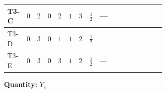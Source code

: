 \documentclass[8pt]{article}
\begin{document}
\begin{landscape}
\begin{longtable}{@{}llcccccc >{\raggedright\arraybackslash}p{0.21\linewidth} >{\raggedright\arraybackslash}p{0.21\linewidth} >{\raggedright\arraybackslash}p{0.21\linewidth}@{}}
\midrule
T3-C & $0$ & $2$ & $0$ & $2$ & $1$ & $3$ & $\frac{1}{2}$ & --- & \scriptsize\adjustbox{max width=\linewidth}{$\begin{gathered} -\frac{9}{4} {g_2}^2 \left({Y_e}\right)_{ij}\end{gathered}$} & \scriptsize\adjustbox{max width=\linewidth}{$\begin{gathered} -\frac{15}{4} {g_1}^2 \left({Y_e}\right)_{ij}\end{gathered}$} \\
\midrule
T3-D & $0$ & $3$ & $0$ & $1$ & $1$ & $2$ & $\frac{1}{2}$ & \scriptsize\adjustbox{max width=\linewidth}{$\begin{gathered} +\frac{1}{4} (3 \left({y_1}\,\left({y_1}\right)^{\dagger}\,{Y_e}\right)_{ij}+2 \left({y_2}\,\left({y_2}\right)^{\dagger}\,{Y_e}\right)_{ij}+6 \left({Y_e}\,\left({Y_e}\right)^{\dagger}\,{Y_e}\right)_{ij})\end{gathered}$} & \scriptsize\adjustbox{max width=\linewidth}{$\begin{gathered} -\frac{9}{4} {g_2}^2 \left({Y_e}\right)_{ij}\end{gathered}$} & \scriptsize\adjustbox{max width=\linewidth}{$\begin{gathered} -\frac{15}{4} {g_1}^2 \left({Y_e}\right)_{ij}\end{gathered}$} \\
\midrule
T3-E & $0$ & $3$ & $0$ & $3$ & $1$ & $2$ & $\frac{1}{2}$ & --- & \scriptsize\adjustbox{max width=\linewidth}{$\begin{gathered} -\frac{9}{4} {g_2}^2 \left({Y_e}\right)_{ij}\end{gathered}$} & \scriptsize\adjustbox{max width=\linewidth}{$\begin{gathered} -\frac{15}{4} {g_1}^2 \left({Y_e}\right)_{ij}\end{gathered}$} \\
\midrule
\bottomrule
\end{longtable}
\clearpage
\noindent\textbf{Quantity: }$Y_e$\par\smallskip

\end{landscape}
\end{document}
